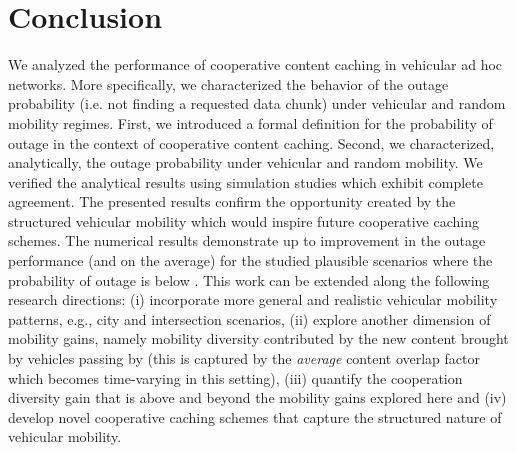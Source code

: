 \documentclass[conference,a4paper]{IEEEtran}
\begin{document}
\section{Conclusion \label{sec:conclusion}}
We analyzed the performance of cooperative content caching in vehicular ad hoc networks. More specifically, we characterized the behavior of the outage probability (i.e. not finding a requested data chunk) under vehicular and random mobility regimes. First, we introduced a formal definition for the probability of outage in the context of cooperative content caching. Second, we characterized, analytically, the outage probability under vehicular and random mobility. We verified the analytical results using simulation studies which exhibit complete agreement. The presented results confirm the opportunity created by the structured vehicular mobility which would inspire future cooperative caching schemes. The numerical results demonstrate up to  improvement in the outage performance (and  on the average) for the studied plausible scenarios where the probability of outage is below . This work can be extended along the following research directions: (i) incorporate more general and realistic vehicular mobility patterns, e.g., city and intersection scenarios, (ii) explore another dimension of mobility gains, namely mobility diversity contributed by the new content brought by vehicles passing by (this is captured by the {\it average} content overlap factor  which becomes time-varying in this setting), (iii) quantify the cooperation diversity gain that is above and beyond the mobility gains explored here and (iv) develop novel cooperative caching schemes that capture the structured nature of vehicular mobility.

\linespread{1.1}
\end{document}
